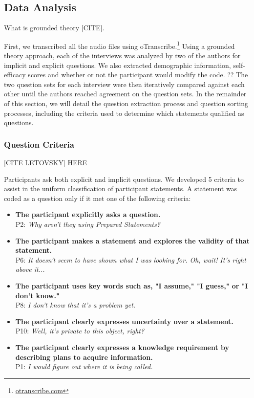 \documentclass[conference]{IEEEtran}
\begin{document}
\subsection{Data Analysis}
\label{dataAnalysis}
What is grounded theory [CITE]. 

First, we transcribed all the audio files using oTranscribe.\footnote{\url{otranscribe.com}}
Using a grounded theory approach, each of the interviews was analyzed by two of the authors for implicit and explicit questions. 
We also extracted demographic information, self-efficacy scores and whether or not the participant would modify the code. ?? The two question sets for each interview were then iteratively compared against each other until the authors reached agreement on the question sets. 
In the remainder of this section, we will detail the question extraction process and question sorting processes, including the criteria used to determine which statements qualified as questions.
\subsubsection{Question Criteria}
[CITE LETOVSKY] HERE

Participants ask both explicit and implicit questions. We developed 5 criteria to assist in the uniform classification of participant statements. A statement was coded as a question only if it met one of the following criteria:

\begin{itemize}
\item \textbf{The participant explicitly asks a question.}
\\ P2: \textit{Why aren't they using Prepared Statements?}
\item \textbf{The participant makes a statement and explores the validity of that statement.}
\\ P6: \textit{It doesn't seem to have shown what I was looking for. Oh, wait! It's right above it...}
\item \textbf{The participant uses key words such as, "I assume," "I guess," or "I don't know."}
\\ P8: \textit{I don't know that it's a problem yet.}
\item \textbf{The participant clearly expresses uncertainty over a statement.}
\\ P10: \textit{Well, it's private to this object, right?}
\item \textbf{The participant clearly expresses a knowledge requirement by describing plans to acquire information.}
\\ P1: \textit{I would figure out where it is being called.}

\end{itemize}
\end{document}
